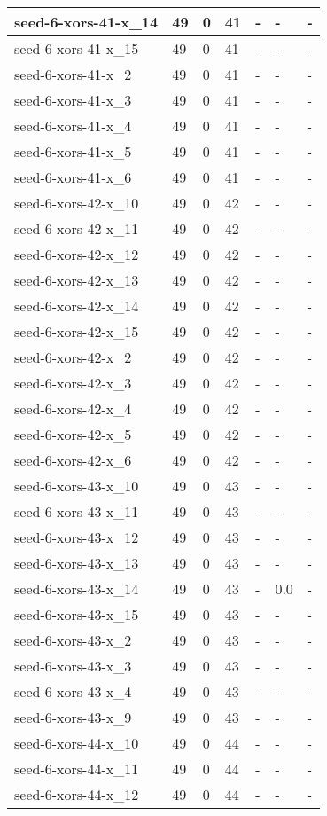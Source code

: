 \begin{scriptsize}
\begin{longtable}{|p{5cm}|l|l|l|l|l|l|}
seed-6-xors-41-x\_14&49&0&41&-&-&- \\ \hline 
seed-6-xors-41-x\_15&49&0&41&-&-&- \\ \hline 
seed-6-xors-41-x\_2&49&0&41&-&-&- \\ \hline 
seed-6-xors-41-x\_3&49&0&41&-&-&- \\ \hline 
seed-6-xors-41-x\_4&49&0&41&-&-&- \\ \hline 
seed-6-xors-41-x\_5&49&0&41&-&-&- \\ \hline 
seed-6-xors-41-x\_6&49&0&41&-&-&- \\ \hline 
seed-6-xors-42-x\_10&49&0&42&-&-&- \\ \hline 
seed-6-xors-42-x\_11&49&0&42&-&-&- \\ \hline 
seed-6-xors-42-x\_12&49&0&42&-&-&- \\ \hline 
seed-6-xors-42-x\_13&49&0&42&-&-&- \\ \hline 
seed-6-xors-42-x\_14&49&0&42&-&-&- \\ \hline 
seed-6-xors-42-x\_15&49&0&42&-&-&- \\ \hline 
seed-6-xors-42-x\_2&49&0&42&-&-&- \\ \hline 
seed-6-xors-42-x\_3&49&0&42&-&-&- \\ \hline 
seed-6-xors-42-x\_4&49&0&42&-&-&- \\ \hline 
seed-6-xors-42-x\_5&49&0&42&-&-&- \\ \hline 
seed-6-xors-42-x\_6&49&0&42&-&-&- \\ \hline 
seed-6-xors-43-x\_10&49&0&43&-&-&- \\ \hline 
seed-6-xors-43-x\_11&49&0&43&-&-&- \\ \hline 
seed-6-xors-43-x\_12&49&0&43&-&-&- \\ \hline 
seed-6-xors-43-x\_13&49&0&43&-&-&- \\ \hline 
seed-6-xors-43-x\_14&49&0&43&-&0.0&- \\ \hline 
seed-6-xors-43-x\_15&49&0&43&-&-&- \\ \hline 
seed-6-xors-43-x\_2&49&0&43&-&-&- \\ \hline 
seed-6-xors-43-x\_3&49&0&43&-&-&- \\ \hline 
seed-6-xors-43-x\_4&49&0&43&-&-&- \\ \hline 
seed-6-xors-43-x\_9&49&0&43&-&-&- \\ \hline 
seed-6-xors-44-x\_10&49&0&44&-&-&- \\ \hline 
seed-6-xors-44-x\_11&49&0&44&-&-&- \\ \hline 
seed-6-xors-44-x\_12&49&0&44&-&-&- \\ \hline 

\end{longtable}
\end{scriptsize}
